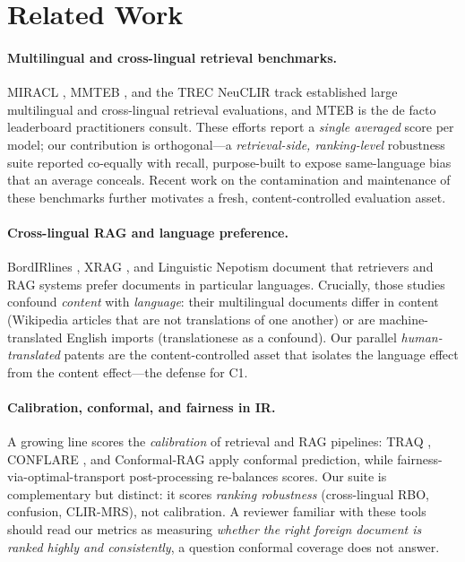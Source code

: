 \documentclass[11pt]{article}
\begin{document}
\section{Related Work}

\paragraph{Multilingual and cross-lingual retrieval benchmarks.}
MIRACL \citep{miracl2023}, MMTEB \citep{mmteb2025}, and the TREC NeuCLIR track
\citep{neuclir2023} established large multilingual and cross-lingual retrieval
evaluations, and MTEB \citep{muennighoff2023mteb} is the de facto leaderboard
practitioners consult. These efforts report a \emph{single averaged} score per
model; our contribution is orthogonal---a \emph{retrieval-side, ranking-level}
robustness suite reported co-equally with recall, purpose-built to expose
same-language bias that an average conceals. Recent work on the contamination
and maintenance of these benchmarks \citep{mteb_contamination2025} further
motivates a fresh, content-controlled evaluation asset.

\paragraph{Cross-lingual RAG and language preference.}
BordIRlines \citep{bordirlines2024}, XRAG \citep{xrag2025}, and Linguistic
Nepotism \citep{nepotism2025} document that retrievers and RAG systems prefer
documents in particular languages. Crucially, those studies confound
\emph{content} with \emph{language}: their multilingual documents differ in
content (Wikipedia articles that are not translations of one another) or are
machine-translated English imports (translationese as a confound). Our parallel
\emph{human-translated} patents are the content-controlled asset that isolates
the language effect from the content effect---the defense for C1.

\paragraph{Calibration, conformal, and fairness in IR.}
A growing line scores the \emph{calibration} of retrieval and RAG pipelines:
TRAQ \citep{traq2023}, CONFLARE \citep{conflare2024}, and Conformal-RAG
\citep{conformalrag2025} apply conformal prediction, while fairness-via-optimal-transport
post-processing \citep{fairnessot2023,buyl2022optimal} re-balances scores. Our
suite is complementary but distinct: it scores \emph{ranking robustness}
(cross-lingual RBO, confusion, CLIR-MRS), not calibration. A reviewer familiar
with these tools should read our metrics as measuring \emph{whether the right
foreign document is ranked highly and consistently}, a question conformal
coverage does not answer.
\end{document}
